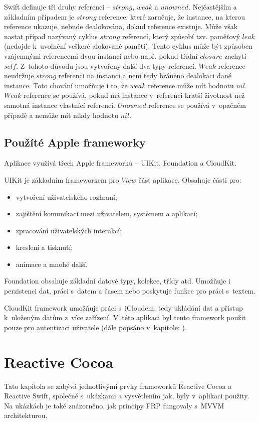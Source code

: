 \documentclass[thesis=M,czech]{FITthesis}[2012/06/26]
\begin{document}
Swift definuje tři druhy referencí -- $strong$, $weak$ a $unowned$. Nejčastějším a základním případem je $strong$ reference, které zaručuje, že instance, na kterou reference ukazuje, nebude dealokována, dokud reference existuje. Může však nastat případ nazývaný cyklus $strong$ referencí, který způsobí tzv. paměťový $leak$ (nedojde k~uvolnění veškeré alokované paměti). Tento cyklus může být způsoben vzájemnými referencemi dvou instancí nebo např. pokud třídní $closure$ zachytí $self$. Z~tohoto důvodu jsou vytvořeny další dva typy referencí. $Weak$ reference neudržuje $strong$ referenci na instanci a není tedy bráněno dealokaci dané instance. Toto chování umožňuje i to, že $weak$ reference může mít hodnotu $nil$. $Weak$ reference se používá, pokud má instance v~referenci kratší životnost než samotná instance vlastnící referenci. $Unowned$ reference se používá v~opačném případě a nemůže mít nikdy hodnotu $nil$. \cite{devMemory}

\subsection{Použíté Apple frameworky}
Aplikace využívá třech Apple frameworků -- UIKit, Foundation a CloudKit.

UIKit je základním frameworkem pro $View$ část aplikace. Obsahuje části pro:
\begin{itemize}
\item vytvoření uživatelského rozhraní;
\item zajištění komunikaci mezi uživatelem, systémem a aplikací;
\item zpracování uživatelských interakcí;
\item kreslení a tisknutí;
\item animace a mnohé další. \cite{UIKit}
\end{itemize} 

Foundation obsahuje základní datové typy, kolekce, třídy atd. Umožňuje i perzistenci dat, práci s~datem a časem nebo poskytuje funkce pro práci s~textem. \cite{foundation}

CloudKit framework umožňuje práci s~iCloudem, tedy ukládání dat a přístup k~uloženým datům z~více zařízení. V~této aplikaci byl tento framework použit pouze pro autentizaci uživatele (dále popsáno v~kapitole: ).

\section{Reactive Cocoa}
Tato kapitola se zabývá jednotlivými prvky frameworků Reactive Cocoa a Reactive Swift, společně s~ukázkami a vysvětlením jak, byly v~aplikaci použity. Na ukázkách je také znázorněno, jak principy FRP fungovaly s~MVVM architekturou.
\end{document}
